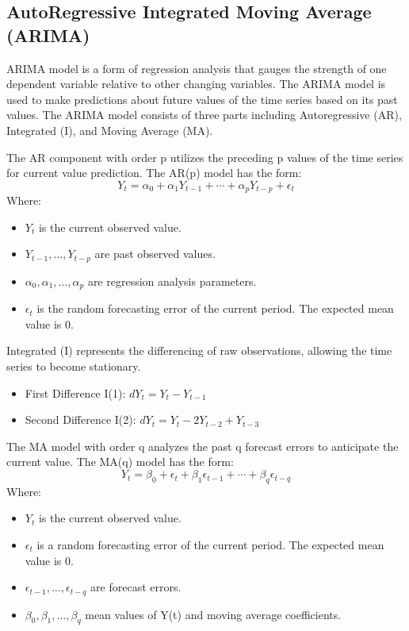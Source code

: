 \documentclass{ieeeojies}
\begin{document}
 \subsection{AutoRegressive Integrated Moving Average (ARIMA)}
 ARIMA model is a form of regression analysis that gauges the strength of one dependent variable relative to other changing variables. The ARIMA model is used to make predictions about future values of the time series based on its past values. The ARIMA model consists of three parts including Autoregressive (AR), Integrated (I), and Moving Average (MA). \cite{investopedia_arima} \par
\noindent
 The AR component with order p utilizes the preceding p values of the time series for current value prediction. The AR(p) model has the form:
 \[Y_t=\alpha_0+\alpha_1Y_{t-1}+\cdots+\alpha_pY_{t-p}+\epsilon_t\]
Where:
    \begin{itemize}
	\item $Y_t$ is the current observed value.
        \item $Y_{t-1}, \ldots, Y_{t-p}$ are past observed values.
        \item $\alpha_0, \alpha_1, \ldots, \alpha_p$ are regression analysis parameters.
        \item $\epsilon_t$ is the random forecasting error of the current period. The expected mean value is 0.
    \end{itemize}
 Integrated (I) represents the differencing of raw observations, allowing the time series to become stationary.
 \begin{itemize}
    \item First Difference I(1): $dY_t = Y_t - Y_{t-1}$
    \item Second Difference I(2): $dY_t = Y_t - 2Y_{t-2} + Y_{t-3}$
 \end{itemize}
The MA model with order q analyzes the past q forecast errors to anticipate the current value. The MA(q) model has the form:
  \[Y_t=\beta_0+\epsilon_t+\beta_1\epsilon_{t-1}+\cdots+\beta_q\epsilon_{t-q}\]
        Where:
        \begin{itemize}
	    \item $Y_t$ is the current observed value.
            \item $\epsilon_t$ is a random forecasting error of the current period. The expected mean value is 0.
            \item \(\epsilon_{t-1}, \ldots, \epsilon_{t-q}\) are forecast errors.
            \item \(\beta_0, \beta_1, \ldots, \beta_q\) mean values of Y(t) and moving average coefficients.
            \cite{arima_forecasting}
        \end{itemize}
            
\end{document}
